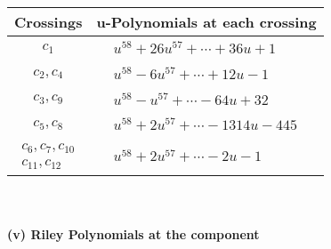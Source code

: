 \documentclass[1p]{elsarticle_modified}
\theoremstyle{definition}
\begin{document}
\begin{tabular}{m{50pt}|m{274pt}}
Crossings & \hspace{64pt}u-Polynomials at each crossing \\
\hline $$\begin{aligned}c_{1}\end{aligned}$$&$\begin{aligned}
&u^{58}+26 u^{57}+\cdots+36 u+1
\end{aligned}$\\
\hline $$\begin{aligned}c_{2},c_{4}\end{aligned}$$&$\begin{aligned}
&u^{58}-6 u^{57}+\cdots+12 u-1
\end{aligned}$\\
\hline $$\begin{aligned}c_{3},c_{9}\end{aligned}$$&$\begin{aligned}
&u^{58}- u^{57}+\cdots-64 u+32
\end{aligned}$\\
\hline $$\begin{aligned}c_{5},c_{8}\end{aligned}$$&$\begin{aligned}
&u^{58}+2 u^{57}+\cdots-1314 u-445
\end{aligned}$\\
\hline $$\begin{aligned}c_{6},c_{7},c_{10}\\c_{11},c_{12}\end{aligned}$$&$\begin{aligned}
&u^{58}+2 u^{57}+\cdots-2 u-1
\end{aligned}$\\
\hline
\end{tabular}\\~\\
\newpage\renewcommand{\arraystretch}{1}
\flushleft \textbf{(v) Riley Polynomials at the component}\newline \\
\end{document}
